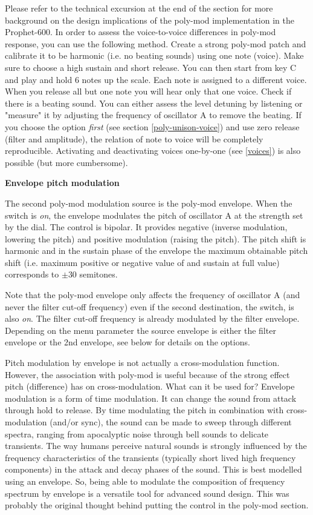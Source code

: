 Please refer to the technical excursion at the end of the section for more background on the design implications of the poly-mod implementation in the Prophet-600. In order to assess the voice-to-voice differences in poly-mod response, you can use the following method. Create a strong poly-mod patch and calibrate it to be harmonic (i.e. no beating sounds) using one note (voice). Make sure to choose a high sustain and short release. You can then start from key C and play and hold 6 notes up the scale. Each note is assigned to a different voice. When you release all but one note you will hear only that one voice. Check if there is a beating sound. You can either assess the level detuning by listening or "measure" it by adjusting the frequency of oscillator A to remove the beating. If you choose the \assign option \textit{first} (see section \ref{poly-unison-voice}) and use zero release (filter and amplitude), the relation of note to voice will be completely reproducible. Activating and deactivating voices one-by-one (see \ref{voices}) is also possible (but more cumbersome).

\textbf{Envelope pitch modulation}

The second poly-mod modulation source is the poly-mod envelope. When the \polymodfreq switch is \textit{on}, the envelope modulates the pitch of oscillator A at the strength set by the \polymodenv dial. The \polymodenv control is bipolar. It  provides negative (inverse modulation, lowering the pitch) and positive modulation (raising the pitch). The pitch shift is harmonic and in the sustain phase of the envelope the maximum obtainable pitch shift (i.e. maximum positive or negative value of \polymodenv and sustain at full value) corresponds to $\pm 30$ semitones.

Note that the poly-mod envelope only affects the frequency of oscillator A (and never the filter cut-off frequency) even if the second destination, the \polymodfilter switch, is also \textit{on}. The filter cut-off frequency is already modulated by the filter envelope. Depending on the menu parameter \envrouting the source envelope is either the filter envelope or the 2nd envelope, see below for details on the options.

Pitch modulation by envelope is not actually a cross-modulation function. However, the association with poly-mod is useful because of the strong effect pitch (difference) has on cross-modulation. What can it be used for? Envelope modulation is a form of time modulation. It can change the sound from attack through hold to release. By time modulating the pitch in combination with cross-modulation (and/or sync), the sound can be made to sweep through different spectra, ranging from apocalyptic noise through bell sounds to delicate transients. The way humans perceive natural sounds is strongly influenced by the frequency characteristics of the transients (typically short lived high frequency components) in the attack and decay phases of the sound. This is best modelled using an envelope. So, being able to modulate the composition of frequency spectrum by envelope is a versatile tool for advanced sound design. This was probably the original thought behind putting the \polymodenv control in the poly-mod section.

